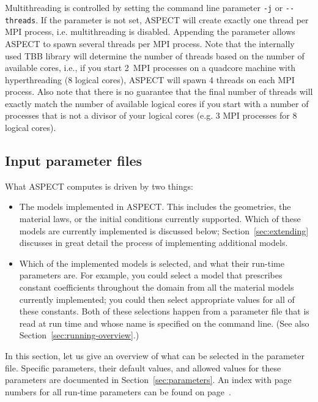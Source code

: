 \documentclass{article}
\newcommand{\aspect}{\textsc{ASPECT}}
\begin{document}
Multithreading is controlled by setting the command line parameter \texttt{-j}
or \texttt{-{}-threads}. If the parameter is not set, \aspect{} will create
exactly one thread per MPI process, i.e. multithreading is disabled.  Appending
the parameter allows \aspect{} to spawn several threads per MPI process. Note
that the internally used TBB library will determine the number of threads based
on the number of available cores, i.e., if you start 2~MPI processes on a
quadcore machine with hyperthreading (8 logical cores), \aspect{} will spawn 4
threads on each MPI process. Also note that there is no guarantee that the
final number of threads will exactly match the number of available logical
cores if you start with a number of processes that is not a divisor of your
logical cores (e.g. 3 MPI processes for 8 logical cores).

\subsection{Input parameter files}
\label{sec:parameters-overview}

What \aspect{} computes is driven by two things:
\begin{itemize}
\item The models implemented in \aspect{}. This includes the geometries, the
  material laws, or the initial conditions currently supported. Which of these
  models are currently implemented is discussed below;
  Section~\ref{sec:extending} discusses in great detail the process of
  implementing additional models.

\item Which of the implemented models is selected, and what their run-time
  parameters are. For example, you could select a model that prescribes
  constant coefficients throughout the domain from all the material models
  currently implemented; you could then select appropriate values for all of
  these constants. Both of these selections happen from a parameter file that
  is read at run time and whose name is specified on the command line. (See
  also Section~\ref{sec:running-overview}.)
\end{itemize}
In this section, let us give an overview of what can be selected in the
parameter file. Specific parameters, their default values, and allowed values
for these parameters are documented in Section~\ref{sec:parameters}. An index
with page numbers for all run-time parameters can be found on
page~\pageref{sec:runtime-parameter-index}.
\end{document}
